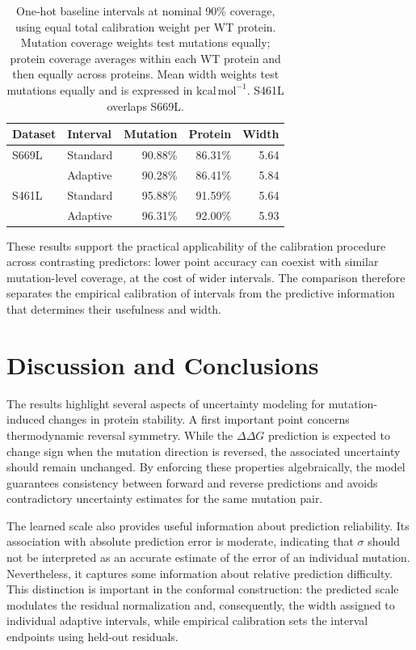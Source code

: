 \documentclass[11pt]{article}
\begin{document}
\begin{table}[t]
\centering
\caption{One-hot baseline intervals at nominal 90\% coverage, using equal total
calibration weight per WT protein. Mutation coverage weights test mutations
equally; protein coverage averages within each WT protein and then equally across
proteins. Mean width weights test mutations equally and is expressed in
$\mathrm{kcal\,mol^{-1}}$. S461L overlaps S669L.}
\label{tab:naive_coverage}
\small
\begin{tabular}{llrrr}
\toprule
Dataset & Interval & Mutation  & Protein  & Width \\
\midrule
S669L & Standard & 90.88\% & 86.31\% & 5.64 \\
      & Adaptive & 90.28\% & 86.41\% & 5.84 \\
S461L & Standard & 95.88\% & 91.59\% & 5.64 \\
      & Adaptive & 96.31\% & 92.00\% & 5.93 \\
\bottomrule
\end{tabular}
\end{table}

These results support the practical applicability of the calibration procedure
across contrasting predictors: lower point accuracy can coexist with similar
mutation-level coverage, at the cost of wider intervals. The comparison therefore
separates the empirical calibration of intervals from the predictive information
that determines their usefulness and width.



\section{Discussion and Conclusions}

The results highlight several aspects of uncertainty modeling for mutation-induced
changes in protein stability. A first important point concerns thermodynamic reversal
symmetry. While the $\Delta\Delta G$ prediction is expected to change sign when the
mutation direction is reversed, the associated uncertainty should remain unchanged.
By enforcing these properties algebraically, the model guarantees consistency between
forward and reverse predictions and avoids contradictory uncertainty estimates for the
same mutation pair.

The learned scale also provides useful information about prediction reliability. Its
association with absolute prediction error is moderate, indicating that $\sigma$ should
not be interpreted as an accurate estimate of the error of an individual mutation.
Nevertheless, it captures some information about relative prediction difficulty.
This distinction is important in the conformal construction:
the predicted scale modulates the residual normalization and, consequently, the width
assigned to individual adaptive intervals, while empirical calibration 
sets the interval endpoints using held-out residuals.
\end{document}
